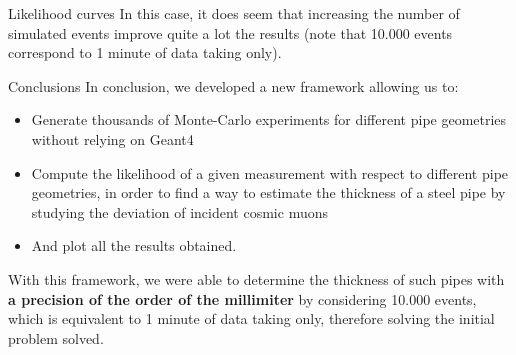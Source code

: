 \documentclass[8 pt]{beamer}
\begin{document}
\begin{frame}{Likelihood curves}
In this case, it does seem that increasing the number of simulated events improve quite a lot the results (note that 10.000 events correspond to 1 minute of data taking only). \vfill
\end{frame}










\begin{frame}{Conclusions}
\justifying
In conclusion, we developed a new framework allowing us to:
\begin{itemize}
\justifying
\item Generate thousands of Monte-Carlo experiments for different pipe geometries without relying on Geant4
\item Compute the likelihood of a given measurement with respect to different pipe geometries, in order to find a way to estimate the thickness of a steel pipe by studying the deviation of incident cosmic muons
\item And plot all the results obtained.
\end{itemize} \vfill

With this framework, we were able to determine the thickness of such pipes with \textbf{a precision of the order of the millimiter} by considering 10.000 events, which is equivalent to 1 minute of data taking only, therefore solving the initial problem solved. \vfill
\end{frame}
\end{document}
